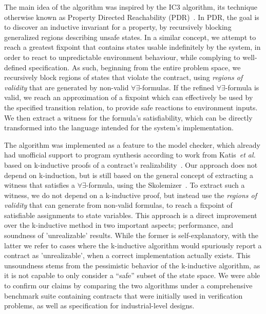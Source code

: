 The main idea of the algorithm was inspired by the IC3 algorithm, its
technique otherwise known as Property Directed Reachability
(PDR)~\cite{bradley2011sat,een2011efficient}. In PDR, the goal is to discover an
inductive invariant for a property, by recursively blocking generalized regions describing unsafe states. In a similar concept, we attempt
to reach a greatest fixpoint that contains states usable indefinitely by the
system, in order to react to unpredictable environment behaviour, while
complying to well-defined specification. As such, beginning from the entire
problem space, we recursively block regions of states that violate the contract, using \textit{regions of validity} that are
generated by non-valid $\forall\exists$-formulas. If the refined
$\forall\exists$-formula is valid, we reach an approximation of a fixpoint which can effectively be used by the specified transition relation, to
provide safe reactions to environment inputs. We then extract a witness for the
formula's satisfiability, which can be directly transformed into the
language intended for the system's implementation.

The algorithm was implemented as a feature to the \jkind model checker, which
already had unofficial support to program synthesis according to work from
Katis~\textit{et al.} based on k-inductive proofs of a contract's
realizability~\cite{gacek2015towards,katis2016towards,katis2016synthesis}.
Our approach does not depend on k-induction, but is still based on the general
concept of extracting a witness that satisfies a $\forall\exists$-formula, using
the \aeval Skolemizer~\cite{fedyukovich2015automated}. To extract such a witness, we do not depend on a k-inductive proof, but instead use the \textit{regions of validity} that \aeval can generate from non-valid formulas,
to reach a fixpoint of satisfiable assignments to state variables.
This approach is a direct improvement over the k-inductive method in two
important aspects; performance, and soundness of 'unrealizable' results. While
the former is self-explanatory, with the latter we refer to cases where the
k-inductive algorithm would spuriously report a contract as 'unrealizable', when a correct
implementation actually exists. This unsoundness stems from the pessimistic
behavior of the k-inductive algorithm, as it is not capable to only consider a
``safe'' subset of the state space. We were able to confirm our claims
by comparing the two algorithms under a comprehensive benchmark suite containing
contracts that were initially used in verification problems, as well as
specification for industrial-level designs.

